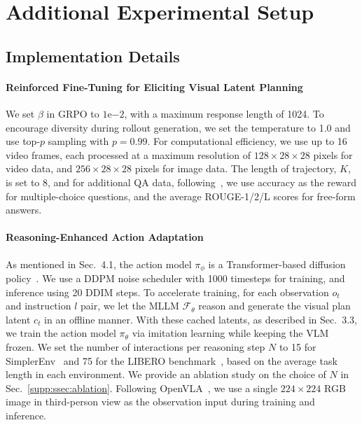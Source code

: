 \appendix

\renewcommand{\thefigure}{A\arabic{figure}}
\renewcommand{\thetable}{A\arabic{table}}

\section{Additional Experimental Setup}

\subsection{Implementation Details}

\paragraph{Reinforced Fine-Tuning for Eliciting Visual Latent Planning} We set $\beta$ in GRPO to $1\text{e}{-2}$, with a maximum response length of 1024. To encourage diversity during rollout generation, we set the temperature to 1.0 and use top-$p$ sampling with $p = 0.99$. For computational efficiency, we use up to 16 video frames, each processed at a maximum resolution of $128 \times 28 \times 28$ pixels for video data, and $256 \times 28 \times 28$ pixels for image data. The length of trajectory, $K$, is set to 8, and for additional QA data, following~\cite{feng2025video}, we use accuracy as the reward for multiple-choice questions, and the average ROUGE-1/2/L scores for free-form answers.

\paragraph{Reasoning-Enhanced Action Adaptation} As mentioned in Sec.~4.1, the action model $\pi_\phi$ is a Transformer-based diffusion policy~\cite{chi2023diffusion}. We use a DDPM noise scheduler with 1000 timesteps for training, and inference using 20 DDIM steps. To accelerate training, for each observation $o_t$ and instruction $l$ pair, we let the MLLM $\mathcal{F}_\theta$ reason and generate the visual plan latent $c_t$ in an offline manner. With these cached latents, as described in Sec.~3.3, we train the action model $\pi_\theta$ via imitation learning while keeping the VLM frozen. We set the number of interactions per reasoning step $N$ to 15 for SimplerEnv~\cite{li24simpler} and 75 for the LIBERO benchmark~\cite{liu2023libero}, based on the average task length in each environment. We provide an ablation study on the choice of $N$ in Sec.~\ref{supp:ssec:ablation}. Following OpenVLA~\cite{kim24openvla}, we use a single $224 \times 224$ RGB image in third-person view as the observation input during training and inference.


